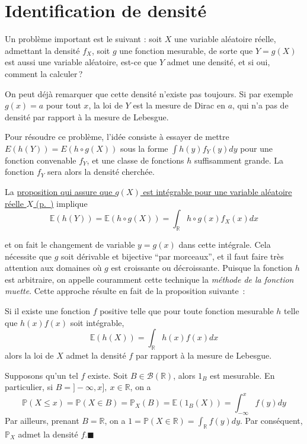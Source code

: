 \chapter{Identification de
densité}\label{II-identification-de-densituxe9-1}

Un problème important est le suivant : soit \(X\) une variable aléatoire
réelle, admettant la densité \(f_X\), soit \(g\) une fonction mesurable,
de sorte que \(Y = g(X)\) est aussi une variable aléatoire, est-ce que
\(Y\) admet une densité, et si oui, comment la calculer\,?

On peut déjà remarquer que cette densité n'existe pas toujours. Si par
exemple \(g(x) = a\) pour tout \(x\), la loi de \(Y\) est la mesure de
Dirac en \(a\), qui n'a pas de densité par rapport à la mesure de
Lebesgue.

Pour résoudre ce problème, l'idée consiste à essayer de mettre
\(E(h(Y )) = E(h \circ g(X))\) sous la forme \(\int h(y)f_Y (y)dy\) pour
une fonction convenable \(f_Y\), et une classe de fonctions \(h\)
suffisamment grande. La fonction \(f_Y\) sera alors la densité cherchée.

La \protect\hyperref[II-esperanceg]{proposition qui assure que \(g(X)\)
est intégrable pour une variable aléatoire réelle
\(X\) (p.~\pageref*{II-esperanceg})} implique
\[ \mathbb{E}(h(Y)) = \mathbb{E}(h \circ g (X)) = \int_{\mathbb{R}} h \circ g(x) f_X(x) dx\]

et on fait le changement de variable \(y = g(x)\) dans cette intégrale.
Cela nécessite que \(g\) soit dérivable et bijective ``par morceaux'',
et il faut faire très attention aux domaines où \(g\) est croissante ou
décroissante. Puisque la fonction \(h\) est arbitraire, on appelle
couramment cette technique la \emph{méthode de la fonction muette}.
Cette approche résulte en fait de la proposition suivante~:

\begin{proposition}\label{II-muxe9thode-de-la-fonction-muette}

Si il existe une fonction \(f\) positive telle que pour toute fonction
mesurable \(h\) telle que \(h(x) f(x)\) soit intégrable,
\[\mathbb{E}(h(X)) = \int_\mathbb{R}h(x) f(x) dx\] alors la loi de \(X\)
admet la densité \(f\) par rapport à la mesure de Lebesgue.
\end{proposition}

\begin{preuve}
Supposons qu'un tel \(f\) existe. Soit
\(B \in \mathcal{B}(\mathbb{R})\), alors \(1_B\) est mesurable. En
particulier, si \(B = ]-\infty,x], ~x\in\mathbb{R}\), on a
\[\mathbb{P}(X\leq x) = \mathbb{P}(X \in B) = \mathbb{P}_X(B) = \mathbb{E}(1_B(X)) = \int_{- \infty}^x f(y)dy\]
Par ailleurs, prenant \(B = \mathbb{R}\), on a
\(1 = \mathbb{P}(X\in \mathbb{R}) = \int_\mathbb{R}f(y) dy\). Par
conséquent, \(\mathbb{P}_X\) admet la densité \(f\).\hfill$\blacksquare$
\end{preuve}

